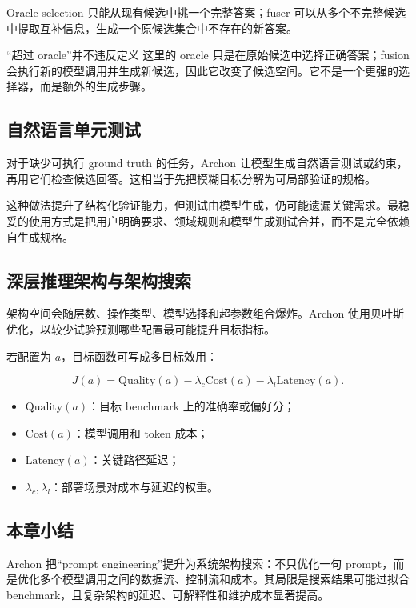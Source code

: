 Oracle selection 只能从现有候选中挑一个完整答案；fuser 可以从多个不完整候选中提取互补信息，生成一个原候选集合中不存在的新答案。


\begin{warningbox}{“超过 oracle”并不违反定义}
这里的 oracle 只是在原始候选中选择正确答案；fusion 会执行新的模型调用并生成新候选，因此它改变了候选空间。它不是一个更强的选择器，而是额外的生成步骤。
\end{warningbox}

\subsection{自然语言单元测试}

对于缺少可执行 ground truth 的任务，Archon 让模型生成自然语言测试或约束，再用它们检查候选回答。这相当于先把模糊目标分解为可局部验证的规格。


这种做法提升了结构化验证能力，但测试由模型生成，仍可能遗漏关键需求。最稳妥的使用方式是把用户明确要求、领域规则和模型生成测试合并，而不是完全依赖自生成规格。

\subsection{深层推理架构与架构搜索}


架构空间会随层数、操作类型、模型选择和超参数组合爆炸。Archon 使用贝叶斯优化，以较少试验预测哪些配置最可能提升目标指标。


若配置为 $a$，目标函数可写成多目标效用：

$$
J(a)=\mathrm{Quality}(a)-\lambda_c\mathrm{Cost}(a)-\lambda_l\mathrm{Latency}(a).
$$

\begin{itemize}
    \item $\mathrm{Quality}(a)$：目标 benchmark 上的准确率或偏好分；
    \item $\mathrm{Cost}(a)$：模型调用和 token 成本；
    \item $\mathrm{Latency}(a)$：关键路径延迟；
    \item $\lambda_c,\lambda_l$：部署场景对成本与延迟的权重。
\end{itemize}


\subsection{本章小结}

Archon 把“prompt engineering”提升为系统架构搜索：不只优化一句 prompt，而是优化多个模型调用之间的数据流、控制流和成本。其局限是搜索结果可能过拟合 benchmark，且复杂架构的延迟、可解释性和维护成本显著提高。

